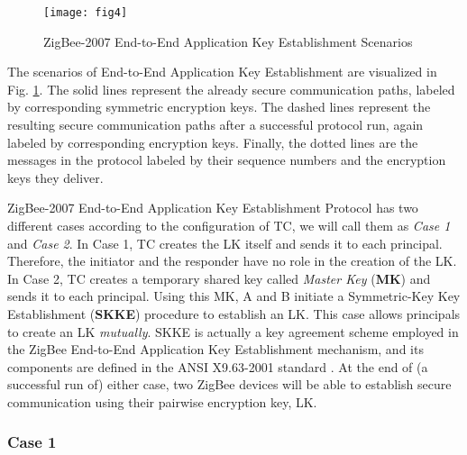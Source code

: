 \begin{figure}[!htp]
\centering
\texttt{[image: fig4]}
\caption{ZigBee-2007 End-to-End Application Key Establishment Scenarios}
\label{fig:scena}
\end{figure}
The scenarios of End-to-End Application Key Establishment are visualized in Fig. \ref{fig:scena}. 
The solid lines represent the already secure communication paths, labeled by corresponding symmetric encryption keys.
The dashed lines represent the resulting secure communication paths after a successful protocol run, again labeled by corresponding encryption keys.
Finally, the dotted lines are the messages in the protocol labeled by their sequence numbers and the encryption keys they deliver.

ZigBee-2007 End-to-End Application Key Establishment Protocol has two different cases according to the configuration of TC, we will call them as \emph{Case 1} and \emph{Case 2}. 
In Case 1, TC creates the LK itself and sends it to each principal. 
Therefore, the initiator and the responder have no role in the creation of the LK. 
In Case 2, TC creates a temporary shared key called \emph{Master Key} (\textbf{MK}) and sends it to each principal.
Using this MK, A and B initiate a Symmetric-Key Key Establishment (\textbf{SKKE}) procedure to establish an LK. 
This case allows principals to create an LK \emph{mutually}. 
SKKE is actually a key agreement scheme employed in the ZigBee End-to-End Application Key Establishment mechanism, and its components are defined in the ANSI X9.63-2001 standard \cite{ansi:x963}.
At the end of (a successful run of) either case, two ZigBee devices will be able to establish secure communication using their pairwise encryption key, LK.

\subsubsection{Case 1}

